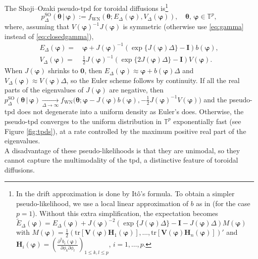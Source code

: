 \documentclass[oneside,11pt]{article}
\newcommand{\T}{\mathbb{T}}
\newcommand{\zero}{\mathbf{0}}
\newcommand{\bphi}{\boldsymbol\varphi}
\newcommand{\btheta}{\boldsymbol\theta}
\newcommand{\bV}{\mathbf{V}}
\newcommand{\bI}{\mathbf{I}}
\newcommand{\bH}{\mathbf{H}}
\newcommand{\lrp}[1]{\left(#1\right)}
\newcommand{\tr}[1]{\mathrm{tr}\left[#1\right]}
\begin{document}
The Shoji--Ozaki pseudo-tpd for toroidal diffusions \nolinebreak[4]is\footnote{In \cite{Shoji1998} the drift approximation is
done by It\^{o}'s formula. To obtain a simpler pseudo-likelihood, we use a local linear
approximation of $b$ as in \cite{Ozaki1985} (for the case $p=1$). Without this extra
simplification, the expectation becomes
$\tilde E_\Delta(\bphi)=E_\Delta(\bphi)+J(\bphi)^{-2}(\exp\{J(\bphi)\Delta\}-\bI-J(\bphi)\Delta)M(\bphi)$ with
$M(\bphi)=\frac{1}{2}\lrp{\tr{\bV(\bphi)\bH_1(\bphi)},\ldots,\tr{\bV(\bphi)\bH_n(\bphi)}}'$
and $\bH_i(\bphi)=\lrp{\tfrac{\partial^2b_i(\bphi)}{\partial \phi_k\partial\phi_l}}_{1\leq k,l\leq p}$,
$i=1,\ldots,p$.}
\[
p^\mathrm{SO}_{\Delta}(\btheta\,|\,\bphi)
:= f_\mathrm{WN}\lrp{\btheta;E_\Delta(\bphi),V_\Delta(\bphi)},\quad \btheta,\,\bphi\in\T^p,
\]
where, assuming that $V(\bphi)^{-1}J(\bphi)$ is symmetric (otherwise use
\eqref{eq:gamma} instead of \eqref{eq:closedgamma}),
\begin{align*}
E_\Delta(\bphi)=&\,\bphi+J(\bphi)^{-1}(\exp\{J(\bphi)\Delta\}-\bI)b(\bphi),\\ V_\Delta(\bphi)=&\,\frac{1}{2}J(\bphi)^{-1}(\exp\{2J(\bphi)\Delta\}-\bI)V(\bphi).
\end{align*}
When $J(\bphi)$ shrinks to $\zero$, then $E_\Delta(\bphi)\approx \bphi +
b(\bphi)\Delta$ and $V_\Delta(\bphi)\approx V(\bphi)\Delta$, so the Euler scheme follows by continuity. If all the real parts of the
eigenvalues of $J(\bphi)$ are negative, then
$
p^\mathrm{SO}_{\Delta}(\btheta\,|\,\bphi)\underset{\Delta\to\infty}{\longrightarrow}
f_\mathrm{WN}\big(\btheta;\bphi -
  J(\bphi)b(\bphi),-\frac{1}{2}J(\bphi)^{-1}V(\bphi)\big)
$
and the pseudo-tpd does not degenerate into a uniform
density as Euler's does. Otherwise, the pseudo-tpd converges to the uniform
distribution in $\T^p$ exponentially fast (see Figure \ref{fig:tpds}), at a rate controlled by the maximum positive real part of the eigenvalues.\\

A disadvantage of these pseudo-likelihoods is that
they are unimodal, so they cannot capture the multimodality of the
tpd, a distinctive feature of toroidal diffusions.
\end{document}
